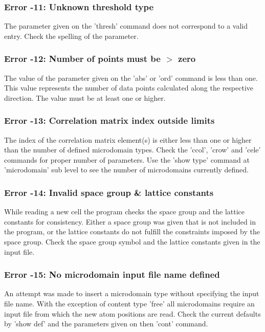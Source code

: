\subsubsection{Error -11: Unknown threshold type}
The parameter given on the 'thresh' command does not correspond to 
a valid entry. Check the spelling of the parameter. 
\subsubsection{Error -12: Number of points must be $> $ zero}
\par
The value of the parameter given on the 'abs' or 'ord' command is 
less than one. This value represents the number of data points 
calculated along the respective direction. 
The value must be at least one or higher. 
\subsubsection{Error -13: Correlation matrix index outside limits}
\par
The index of the correlation matrix element(s) is either less than 
one or higher than the number of defined microdomain types. 
Check the 'ccol', 'crow' and 'cele' commands for proper number of 
parameters. Use the 'show type' command at 'microdomain' sub level 
to see the number of microdomains currently defined. 
\subsubsection{Error -14: Invalid space group \& lattice constants}
\par
While reading a new cell the program checks the space group and the 
lattice constants for consistency. Either a space group was given 
that is not included in the program, or the lattice constants do 
not fulfill the constraints imposed by the space group. Check the 
space group symbol and the lattice constants given in the input file. 
\subsubsection{Error -15: No microdomain input file name defined}
\par
An attempt was made to insert a microdomain type without specifying 
the input file name. With the exception of content type 'free' all 
microdomains require an input file from which the new atom positions 
are read. 
Check the current defaults by 'show def' and the parameters given on 
then 'cont' command. 
